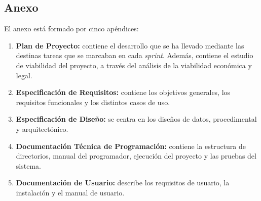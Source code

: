 \subsection{Anexo}
El anexo está formado por cinco apéndices:
\begin{enumerate}
    \item \textbf{Plan de Proyecto:} contiene el desarrollo que se ha llevado mediante las destinas tareas que se marcaban en cada \emph{sprint}. Además, contiene el estudio de viabilidad del proyecto, a través del análisis de la viabilidad económica y legal.
    \item \textbf{Especificación de Requisitos:} contiene los objetivos generales, los requisitos funcionales y los distintos casos de uso.
    \item \textbf{Especificación de Diseño:} se centra en los diseños de datos, procedimental y arquitectónico.
    \item \textbf{Documentación Técnica de Programación:} contiene la estructura de directorios, manual del programador, ejecución del proyecto y las pruebas del sistema.
    \item \textbf{Documentación de Usuario:} describe los requisitos de usuario, la instalación y el manual de usuario.
\end{enumerate}
